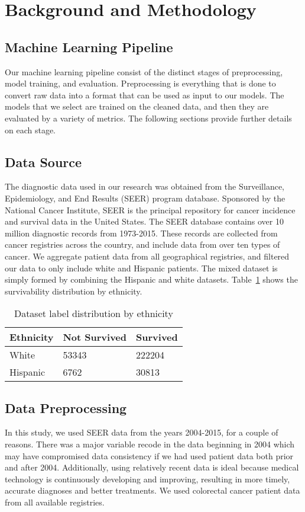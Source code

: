 \documentclass[review]{elsarticle}
\begin{document}
\section{Background and Methodology}

\subsection*{Machine Learning Pipeline}
Our machine learning pipeline consist of the distinct stages of preprocessing, model training, and evaluation. Preprocessing is everything that is done to convert raw data into a format that can be used as input to our models. The models that we select are trained on the cleaned data, and then they are evaluated by a variety of metrics. The following sections provide further details on each stage.
\subsection*{Data Source}
The diagnostic data used in our research was obtained from the Surveillance, Epidemiology, and End Results (SEER) program database\cite{seer-dataset}. Sponsored by the National Cancer Institute, SEER is the principal repository for cancer incidence and survival data in the United States. The SEER database contains over 10 million diagnostic records from 1973-2015. These records are collected from cancer registries across the country, and include data from over ten types of cancer. We aggregate patient data from all geographical registries, and filtered our data to only include white and Hispanic patients. The mixed dataset is simply formed by combining the Hispanic and white datasets. Table~\ref{dataset-info} shows the survivability distribution by ethnicity.

\begin{table}[H]
	\centering
	
	\begin{tabular}{lll}
		\textbf{Ethnicity} & \textbf{Not Survived} & \textbf{Survived}  \\ 
		\hline
		White              & 53343                 & 222204             \\
		Hispanic           & 6762                  & 30813              \\
	\end{tabular}
	\caption{Dataset label distribution by ethnicity}
	\label{dataset-info}
\end{table}

\subsection*{Data Preprocessing}
In this study, we used SEER data from the years 2004-2015, for a couple of reasons. There was a major variable recode in the data beginning in 2004 which may have compromised data consistency if we had used patient data both prior and after 2004. Additionally, using relatively recent data is ideal because medical technology is continuously developing and improving, resulting in more timely, accurate diagnoses and better treatments. We used colorectal cancer patient data from all available registries.
\end{document}
